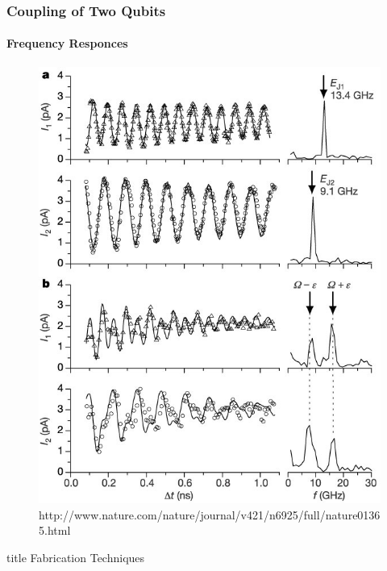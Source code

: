 \documentclass{beamer}
\begin{document}

\begin{frame}
    \frametitle{Coupling of Two Qubits}
    \framesubtitle{Frequency Responces}
    \begin{figure}[ht!]
        \centering
        \includegraphics[height=0.6\textheight]{img/probe-current-osc.jpg}
        \caption{http://www.nature.com/nature/journal/v421/n6925/full/nature01365.html}
    \end{figure}
\end{frame}


\begin{frame}
    \vfill
    \centering
    \begin{beamercolorbox}[sep=8pt,center,shadow=true,rounded=true]{title}
        Fabrication Techniques
    \end{beamercolorbox}
    \vfill
\end{frame}
\end{document}
